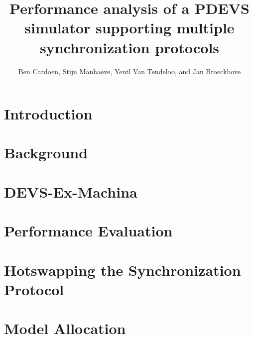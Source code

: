 \documentclass[twocolumn]{sagej}
\begin{document}
\title{Performance analysis of a PDEVS simulator supporting multiple synchronization protocols}

\author{Ben Cardoen, Stijn Manhaeve, Yentl Van Tendeloo, and Jan Broeckhove}




\begin{abstract}

\end{abstract}

\maketitle

\section{Introduction}
\label{sec:1-introduction}


\section{Background}
\label{sec:2-background}


\section{DEVS-Ex-Machina}
\label{sec:3-features}


\section{Performance Evaluation}
\label{sec:4-performance}


\section{Hotswapping the Synchronization Protocol}
\label{sec:4b-hotswap}


\section{Model Allocation}
\label{sec:4a-allocation}

\end{document}

